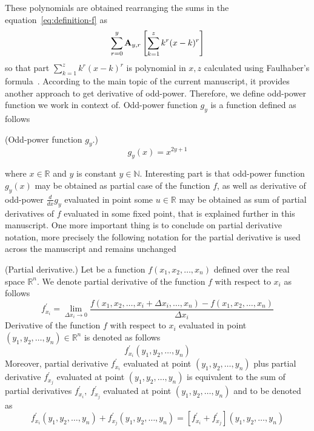 These polynomials are obtained rearranging the sums in the equation~\eqref{eq:definition-f} as
\[
    \sum_{r=0}^{y} {\mathbf{A}} \sb{y,r} \left[ \sum_{k=1}^{z} k^r (x-k)^r \right]
\]
so that part $\sum_{k=1}^{z} k^r (x-k)^r$ is polynomial in $x, z$ calculated using Faulhaber's formula~\cite{beardon1996sums}.
According to the main topic of the current manuscript, it provides another approach to get derivative of odd-power.
Therefore, we define odd-power function we work in context of.
Odd-power function $g_y$ is a function defined as follows
\begin{definition}(Odd-power function $g_y$.)
    \begin{equation*}
        g_{y}(x) = x^{2y + 1}
    \end{equation*}
\end{definition}
where $x\in \mathbb{R}$ and $y$ is constant $y\in \mathbb{N}$.
Interesting part is that odd-power function $g_{y} (x)$ may be obtained as partial case of the function $f$,
as well as derivative of odd-power $\frac{d}{dx} g_{y}$ evaluated in point some $u\in\mathbb{R}$ may be obtained
as sum of partial derivatives of $f$ evaluated in some fixed point, that is explained further in this manuscript.
One more important thing is to conclude on partial derivative notation,
more precisely the following notation for the partial derivative is used across the manuscript and remains unchanged
\begin{notation} (Partial derivative.)
    Let be a function $f(x_1, x_2, \dots, x_n)$ defined over the real space $\mathbb{R}^n$.
    We denote partial derivative of the function $f$ with respect to $x_i$ as follows
    \begin{equation*}
        f^{'}_{x_i} = \lim_{\Delta x_i \to 0} \frac{f(x_1, x_2, \dots, x_i + \Delta x_i, \dots, x_n) - f(x_1, x_2, \dots, x_n)}{\Delta x_i}
    \end{equation*}
    Derivative of the function $f$ with respect to $x_i$
    evaluated in point $(y_1, y_2, \dots, y_n) \in \mathbb{R}^n$ is denoted as follows
    \begin{equation*}
        f^{'}_{x_i} (y_1, y_2, \dots, y_n)
    \end{equation*}
    Moreover, partial derivative $f^{'}_{x_i}$ evaluated at point $(y_1, y_2, \dots, y_n)$ plus
    partial derivative $f^{'}_{x_j}$ evaluated at point $(y_1, y_2, \dots, y_n)$
    is equivalent to the sum of partial derivatives $f^{'}_{x_i}, \; f^{'}_{x_j}$
    evaluated at point $(y_1, y_2, \dots, y_n)$ and to be denoted as
    \begin{equation*}
        f^{'}_{x_i} (y_1, y_2, \dots, y_n) + f^{'}_{x_j} (y_1, y_2, \dots, y_n) = [f^{'}_{x_i} + f^{'}_{x_j}] (y_1, y_2, \dots, y_n)
    \end{equation*}
\end{notation}
